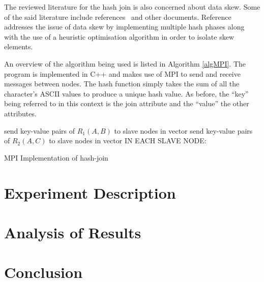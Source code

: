 \documentclass[journal,draftclsnofoot]{IEEEtran}
\begin{document}
The reviewed literature for the hash join is also concerned about data skew. Some of the said literature include references~\cite{Wolf1990,Keller1991} and other documents. Reference~\cite{Wolf1990} addresses the issue of data skew by implementing multiple hash phases along with the use of a heuristic optimisation algorithm in order to isolate skew elements\cite{Wolf1990}.

An overview of the algorithm being used is listed in Algorithm \ref{algMPI}. The program is implemented in C++ and makes use of MPI to send and receive messages between nodes. The hash function simply takes the sum of all the character's ASCII values to produce a unique hash value. As before, the ``key'' being referred to in this context is the join attribute and the ``value'' the other attributes.
\begin{algorithm}
send key-value pairs of $R_{1}(A,B)$ to slave nodes in vector\;
send key-value pairs of $R_{2}(A,C)$ to slave nodes in vector\;
IN EACH SLAVE NODE:\\

 \caption{MPI Implementation of hash-join}
\label{algMPI}
\end{algorithm}

\section{Experiment Description}\label{desc}
\section{Analysis of Results}\label{ana}
\section{Conclusion}\label{conc}


\cleardoublepage
\onecolumn
\end{document}
